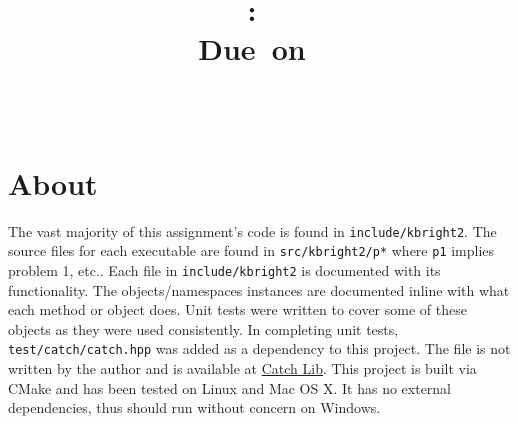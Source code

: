 \documentclass{article}
\title{
\vspace{2in}
\textmd{\textbf{\hmwkClass:\ \hmwkTitle}}\\
\normalsize\vspace{0.1in}\small{Due\ on\ \hmwkDueDate}\\
\vspace{0.1in}\large{\textit{\hmwkClassInstructor\ \hmwkClassTime}}
\vspace{3in}
}
\author{\textbf{\hmwkAuthorName}}
\date{} %
\begin{document}
\maketitle



\newpage
\tableofcontents
\newpage

\section{About}

The vast majority of this assignment's code is found in \verb|include/kbright2|. The source files for each executable are found in \verb|src/kbright2/p*| where \verb|p1| implies problem 1, etc.. Each file in \verb|include/kbright2| is documented with its functionality. The objects/namespaces instances are documented inline with what each method or object does. Unit tests were written to cover some of these objects as they were used consistently. In completing unit tests, \verb|test/catch/catch.hpp| was added as a dependency to this project. The file is not written by the author and is available at \href{http://catch-lib.net/}{Catch Lib}. This project is built via CMake and has been tested on Linux and Mac OS X. It has no external dependencies, thus should run without concern on Windows. 


\end{document}
